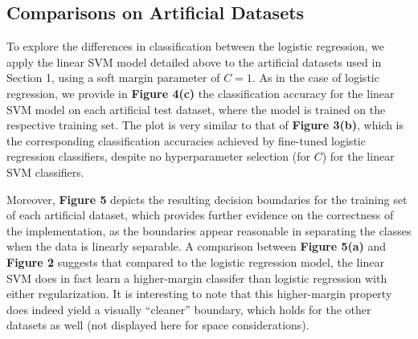 \documentclass[10pt,psamsfonts]{amsart}
\theoremstyle{definition}
\theoremstyle{remark}
\numberwithin{equation}{section}
\begin{document}
\subsection{Comparisons on Artificial Datasets} To explore the differences in classification between the logistic regression, we apply the linear SVM model detailed above to the artificial datasets used in Section 1, using a soft margin parameter of $C = 1$. As in the case of logistic regression, we provide in {\bf Figure 4(c)} the classification accuracy for the linear SVM model on each artificial test dataset, where the model is trained on the respective training set. The plot is very similar to that of {\bf Figure 3(b)}, which is the corresponding classification accuracies achieved by fine-tuned logistic regression classifiers, despite no hyperparameter selection (for $C$) for the linear SVM classifiers.

Moreover, {\bf Figure 5} depicts the resulting decision boundaries for the training set of each artificial dataset, which provides further evidence on the correctness of the implementation, as the boundaries appear reasonable in separating the classes when the data is linearly separable. A comparison between {\bf Figure 5(a)} and {\bf Figure 2} suggests that compared to the logistic regression model, the linear SVM does in fact learn a higher-margin classifer than logistic regression with either regularization. It is interesting to note that this higher-margin property does indeed yield a visually ``cleaner'' boundary, which holds for the other datasets as well (not displayed here for space considerations).
\end{document}
